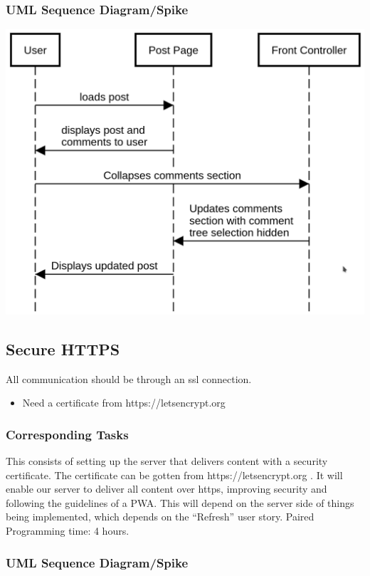 \documentclass[12pt]{article}
\begin{document}
\subsubsection{UML Sequence Diagram/Spike}
\includegraphics[scale=0.5]{img/collapse_post_responses.png}\linebreak

\subsection{Secure HTTPS}
All communication should be through an ssl connection.
\begin{itemize}
  \item Need a certificate from https://letsencrypt.org
\end{itemize}
\subsubsection{Corresponding Tasks}
	This consists of setting up the server that delivers content with a security certificate.  The certificate can be gotten from https://letsencrypt.org .  It will enable our server to deliver all content over https, improving security and following the guidelines of a PWA.  This will depend on the server side of things being implemented, which depends on the “Refresh” user story.  Paired Programming time: 4 hours.
\subsubsection{UML Sequence Diagram/Spike}
\end{document}
